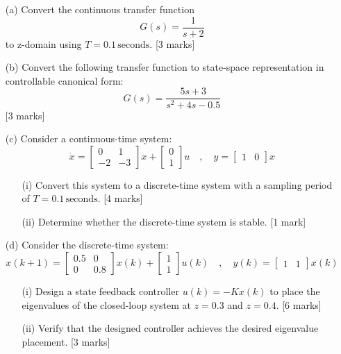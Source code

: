 \documentclass[12pt]{article}
\begin{document}
	\begin{enumerate}
		\item[(a)] Convert the continuous transfer function 
		\[
		G(s) = \frac{1}{s+2}
		\]
		to z-domain using \( T = 0.1 \, \text{seconds} \). \hfill [3 marks]
		
		\item[(b)] Convert the following transfer function to state-space representation in controllable canonical form:
		\[
		G(s) = \frac{5s + 3}{s^2 + 4s - 0.5}
		\]
		\hfill [3 marks]
		
		\item[(c)] Consider a continuous-time system:
		\[
		\dot{x} = 
		\begin{bmatrix}
			0 & 1 \\
			-2 & -3
		\end{bmatrix}x +
		\begin{bmatrix}
			0 \\ 1
		\end{bmatrix}u
		\quad , \quad
		y = 
		\begin{bmatrix}
			1 & 0
		\end{bmatrix}x
		\]
		
		\begin{enumerate}
			\item[(i)] Convert this system to a discrete-time system with a sampling period of \( T = 0.1 \, \text{seconds} \). \hfill [4 marks]
			
			\item[(ii)] Determine whether the discrete-time system is stable. \hfill [1 mark]
		\end{enumerate}
		
		\item[(d)] Consider the discrete-time system:
		\[
		x(k+1) = 
		\begin{bmatrix}
			0.5 & 0 \\
			0 & 0.8
		\end{bmatrix}x(k) +
		\begin{bmatrix}
			1 \\ 1
		\end{bmatrix}u(k)
		\quad , \quad
		y(k) = 
		\begin{bmatrix}
			1 & 1
		\end{bmatrix}x(k)
		\]
		
		\begin{enumerate}
			\item[(i)] Design a state feedback controller \( u(k) = -Kx(k) \) to place the eigenvalues of the closed-loop system at \( z = 0.3 \) and \( z = 0.4 \). \hfill [6 marks]
			
			\item[(ii)] Verify that the designed controller achieves the desired eigenvalue placement. \hfill [3 marks]
		\end{enumerate}
	\end{enumerate}
	
\end{document}
